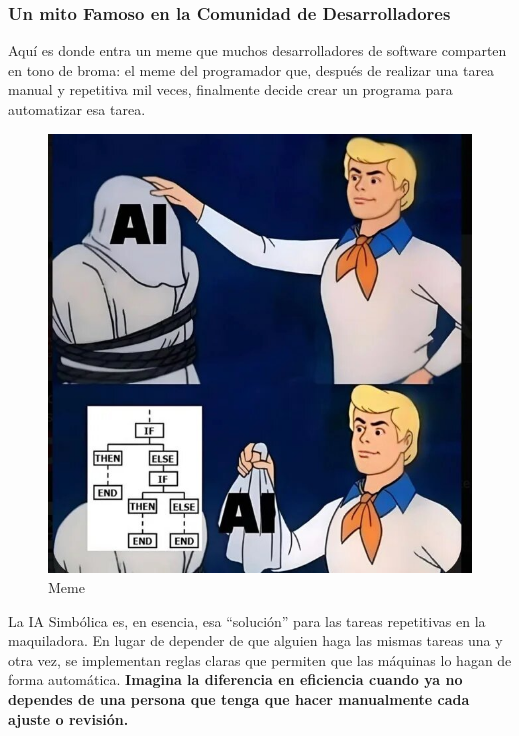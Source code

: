 \documentclass[
  10pt,
  letterpaper,
]{book}
\begin{document}
\subsubsection{Un mito Famoso en la Comunidad de
Desarrolladores}\label{un-mito-famoso-en-la-comunidad-de-desarrolladores}

Aquí es donde entra un meme que muchos desarrolladores de software
comparten en tono de broma: el meme del programador que, después de
realizar una tarea manual y repetitiva mil veces, finalmente decide
crear un programa para automatizar esa tarea.

\begin{figure}[H]

{\centering \includegraphics{Img/ia.jpg}

}

\caption{Meme}

\end{figure}%

La IA Simbólica es, en esencia, esa ``solución'' para las tareas
repetitivas en la maquiladora. En lugar de depender de que alguien haga
las mismas tareas una y otra vez, se implementan reglas claras que
permiten que las máquinas lo hagan de forma automática. \textbf{Imagina
la diferencia en eficiencia cuando ya no dependes de una persona que
tenga que hacer manualmente cada ajuste o revisión.}
\end{document}
